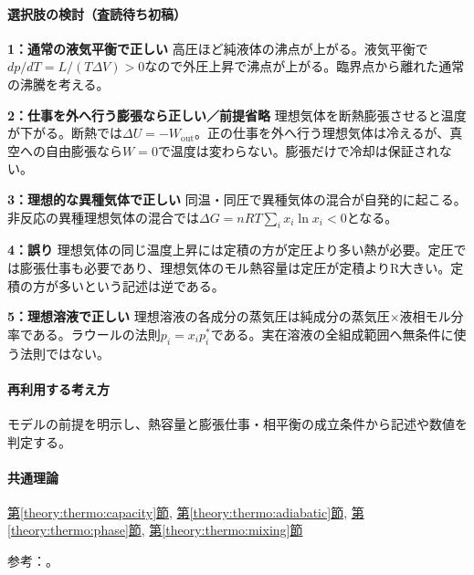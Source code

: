 \paragraph{選択肢の検討（査読待ち初稿）}\mbox{}\par

\noindent\textbf{1：通常の液気平衡で正しい} 高圧ほど純液体の沸点が上がる。液気平衡で\(dp/dT=L/(T\Delta V)>0\)なので外圧上昇で沸点が上がる。臨界点から離れた通常の沸騰を考える。\par

\noindent\textbf{2：仕事を外へ行う膨張なら正しい／前提省略} 理想気体を断熱膨張させると温度が下がる。断熱では\(\Delta U=-W_{\mathrm{out}}\)。正の仕事を外へ行う理想気体は冷えるが、真空への自由膨張なら\(W=0\)で温度は変わらない。膨張だけで冷却は保証されない。\par

\noindent\textbf{3：理想的な異種気体で正しい} 同温・同圧で異種気体の混合が自発的に起こる。非反応の異種理想気体の混合では\(\Delta G=nRT\sum_i x_i\ln x_i<0\)となる。\par

\noindent\textbf{4：誤り} 理想気体の同じ温度上昇には定積の方が定圧より多い熱が必要。定圧では膨張仕事も必要であり、理想気体のモル熱容量は定圧が定積よりR大きい。定積の方が多いという記述は逆である。\par

\noindent\textbf{5：理想溶液で正しい} 理想溶液の各成分の蒸気圧は純成分の蒸気圧×液相モル分率である。ラウールの法則\(p_i=x_i p_i^*\)である。実在溶液の全組成範囲へ無条件に使う法則ではない。\par

\paragraph{再利用する考え方} モデルの前提を明示し、熱容量と膨張仕事・相平衡の成立条件から記述や数値を判定する。

\paragraph{共通理論} \hyperref[theory:thermo:capacity]{第\ref*{theory:thermo:capacity}節}, \hyperref[theory:thermo:adiabatic]{第\ref*{theory:thermo:adiabatic}節}, \hyperref[theory:thermo:phase]{第\ref*{theory:thermo:phase}節}, \hyperref[theory:thermo:mixing]{第\ref*{theory:thermo:mixing}節}

\par 参考：\cite{mit_thermo_adiabatic2008,mit_clapeyron2008,mit_solutions2008}。

